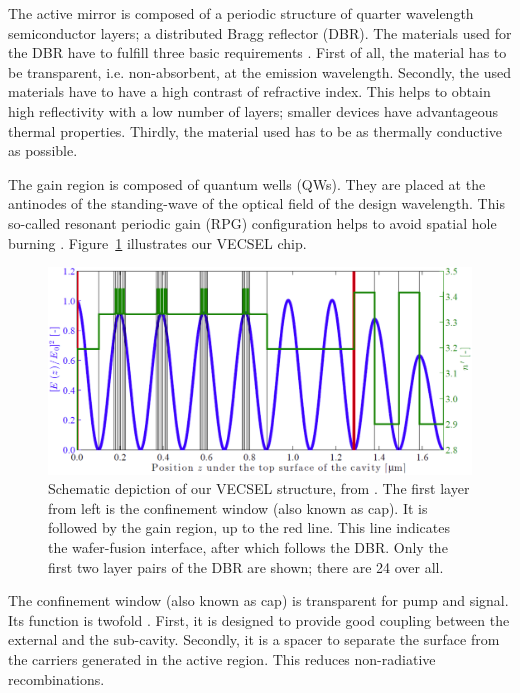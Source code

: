 The active mirror
is composed of
a periodic structure
of quarter wavelength
semiconductor layers;
a distributed Bragg reflector (DBR).
The materials used for the DBR
have to fulfill
three basic requirements
\cite{Calvez2009}.
First of all,
the material has to be transparent,
i.e. non-absorbent,
at the emission wavelength.
Secondly,
the used materials
have to have a high contrast
of refractive index.
This helps to obtain
high reflectivity
with a low number of layers;
smaller devices
have advantageous thermal properties.
Thirdly,
the material used
has to be as thermally conductive as possible.

The gain region
is composed of
quantum wells (QWs).
They are placed
at the antinodes
of the standing-wave
of the optical field
of the design wavelength.
This so-called
resonant periodic gain (RPG)
configuration
helps to avoid spatial hole burning
\cite{Ranta2014OptLett}.
Figure~\ref{img:design}
illustrates our VECSEL chip.

\begin{figure}
\centering
\includegraphics[width=14.5cm]{img/design.png}
\caption{Schematic depiction of our VECSEL structure,
from \cite{Sirbu2014SPIE}.
The first layer from left
is the confinement window
(also known as cap).
It is followed by the
gain region,
up to the red line.
This line indicates
the wafer-fusion interface,
after which follows the DBR.
Only the first two layer pairs
of the DBR
are shown;
there are 24 over all.}
\label{img:design}
\end{figure}

The confinement window
(also known as cap)
is transparent for
pump and signal.
Its function is twofold
\cite{Tropper2006,Calvez2009}.
First,
it is designed to provide
good coupling between
the external and
the sub-cavity.
Secondly,
it is a spacer
to separate the surface
from the carriers
generated in the active region.
This reduces non-radiative recombinations.

